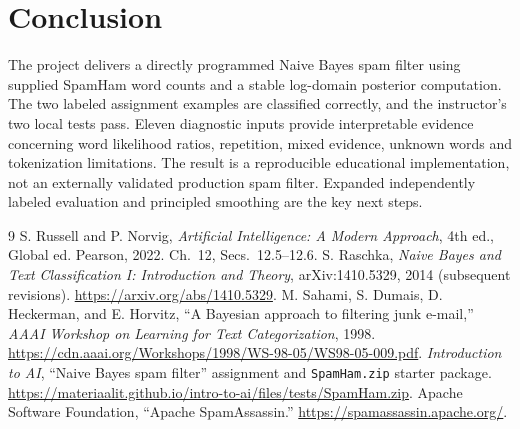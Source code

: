 \documentclass[11pt,letterpaper]{article}
\begin{document}
\section{Conclusion}
The project delivers a directly programmed Naive Bayes spam filter using supplied SpamHam word counts and a stable log-domain posterior computation. The two labeled assignment examples are classified correctly, and the instructor's two local tests pass. Eleven diagnostic inputs provide interpretable evidence concerning word likelihood ratios, repetition, mixed evidence, unknown words and tokenization limitations. The result is a reproducible educational implementation, not an externally validated production spam filter. Expanded independently labeled evaluation and principled smoothing are the key next steps.

\begin{thebibliography}{9}
 S. Russell and P. Norvig, \emph{Artificial Intelligence: A Modern Approach}, 4th ed., Global ed. Pearson, 2022. Ch.~12, Secs.~12.5--12.6.
 S. Raschka, \emph{Naive Bayes and Text Classification I: Introduction and Theory}, arXiv:1410.5329, 2014 (subsequent revisions). \url{https://arxiv.org/abs/1410.5329}.
 M. Sahami, S. Dumais, D. Heckerman, and E. Horvitz, ``A Bayesian approach to filtering junk e-mail,'' \emph{AAAI Workshop on Learning for Text Categorization}, 1998. \url{https://cdn.aaai.org/Workshops/1998/WS-98-05/WS98-05-009.pdf}.
 \emph{Introduction to AI}, ``Naive Bayes spam filter'' assignment and \texttt{SpamHam.zip} starter package. \url{https://materiaalit.github.io/intro-to-ai/files/tests/SpamHam.zip}.
 Apache Software Foundation, ``Apache SpamAssassin.'' \url{https://spamassassin.apache.org/}.
\end{thebibliography}
\end{document}
